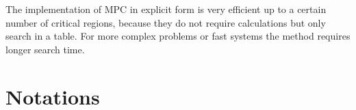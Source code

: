 The implementation of MPC in explicit form is very efficient up to a certain number of critical regions, because they do not require calculations but only search in a table. For more complex problems or fast systems the method requires longer search time.

\section{Notations}

\begin{scriptsize}
\begin{tabularx}{\textwidth}{r|X}


\end{tabularx}
\end{scriptsize}
